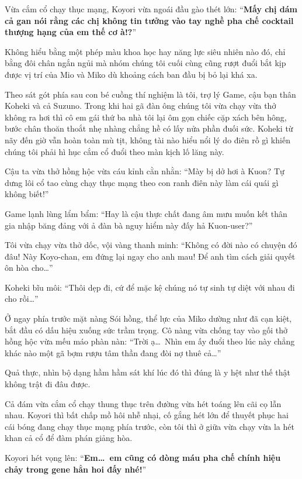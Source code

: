 \documentclass[../main.tex]{subfiles}
\begin{document}
\ct

Vừa cắm cổ chạy thục mạng, Koyori vừa ngoái đầu gào thét lớn: ``\textbf{Mấy chị dám cả gan nói rằng các chị không tin tưởng vào tay nghề pha chế cocktail thượng hạng của em thế cơ à!?}''

Không hiểu bằng một phép màu khoa học hay năng lực siêu nhiên nào đó, chỉ bằng đôi chân ngắn ngủi mà nhóm chúng tôi cuối cùng cũng rượt đuổi bắt kịp được vị trí của Mio và Miko dù khoảng cách ban đầu bị bỏ lại khá xa.

Theo sát gót phía sau con bé cuồng thí nghiệm là tôi, trợ lý Game, cậu bạn thân Koheki và cả Suzuno. Trong khi hai gã đàn ông chúng tôi vừa chạy vừa thở không ra hơi thì cô em gái thứ ba nhà tôi lại ôm gọn chiếc cặp xách bên hông, bước chân thoăn thoắt nhẹ nhàng chẳng hề có lấy nửa phần đuối sức. Koheki từ nãy đến giờ vẫn hoàn toàn mù tịt, không tài nào hiểu nổi lý do điên rồ gì khiến chúng tôi phải hì hục cắm cổ đuổi theo màn kịch lố lăng này.


Cậu ta vừa thở hồng hộc vừa cáu kỉnh cằn nhằn: ``Mày bị dở hơi à Kuon? Tự dưng lôi cổ tao cùng chạy thục mạng theo con ranh điên này làm cái quái gì không biết!''

Game lạnh lùng lẩm bẩm: ``Hay là cậu thực chất đang âm mưu muốn kết thân gia nhập băng đảng với ả đàn bà nguy hiểm này đấy hả Kuon-user?''

Tôi vừa chạy vừa thở dốc, vội vàng thanh minh: ``Không có đời nào có chuyện đó đâu! Này Koyo-chan, em đứng lại ngay cho anh mau! Để anh tìm cách giải quyết ôn hòa cho\dots''

Koheki bĩu môi: ``Thôi dẹp đi, cứ để mặc kệ chúng nó tự sinh tự diệt với nhau đi cho rồi\dots''

Ở ngay phía trước mặt nàng Sói hồng, thể lực của Miko dường như đã cạn kiệt, bắt đầu có dấu hiệu xuống sức trầm trọng. Cô nàng vừa chống tay vào gối thở hồng hộc vừa mếu máo phàn nàn: ``Trời ạ\dots\ Nhìn em ấy đuổi theo lúc này chẳng khác nào một gã bợm rượu tâm thần đang đòi nợ thuê cả\dots''

Quả thực, nhìn bộ dạng hầm hầm sát khí lúc đó thì đúng là y hệt như thế thật không trật đi đâu được.

Cả đám vừa cắm cổ chạy thung thục trên đường vừa hét toáng lên cãi cọ lẫn nhau. Koyori thì bất chấp mồ hôi nhễ nhại, cố gắng hét lớn để thuyết phục hai cái bóng đang chạy thục mạng phía trước, còn tôi thì ở giữa vừa chạy vừa la hét khan cả cổ để đàm phán giảng hòa.

Koyori hét vọng lên: ``\textbf{Em\dots\ em cũng có dòng máu pha chế chính hiệu chảy trong gene hẳn hoi đấy nhé!}''
\end{document}
